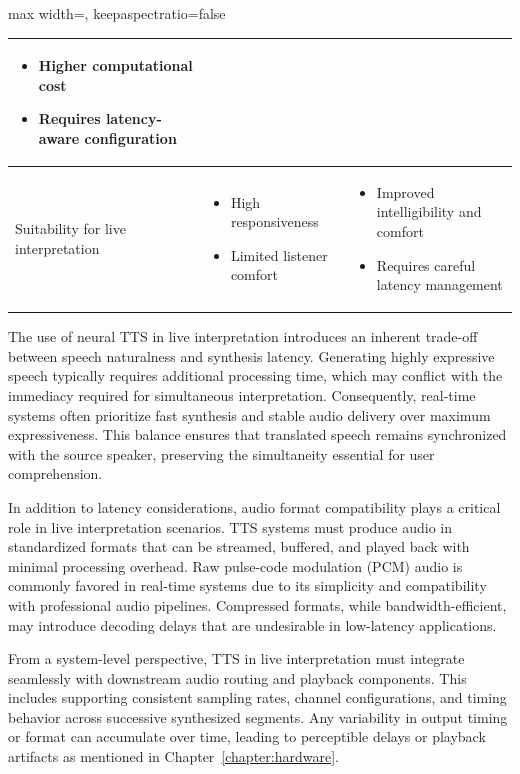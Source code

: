 \begin{table}[!htbp]
\begin{adjustbox}{max width=\textwidth, keepaspectratio=false}
\begin{tabular}{p{4.3cm} p{7.5cm} p{7.5cm}}
\begin{itemize}[nosep,leftmargin=*]
        \item Higher computational cost
        \item Requires latency-aware configuration
      \end{itemize} \\
      \midrule
      Suitability for live interpretation
      &
      \begin{itemize}[nosep,leftmargin=*]
        \item High responsiveness
        \item Limited listener comfort
      \end{itemize}
      &
      \begin{itemize}[nosep,leftmargin=*]
        \item Improved intelligibility and comfort
        \item Requires careful latency management
      \end{itemize} \\
      \bottomrule
    \end{tabular}
  \end{adjustbox}
\end{table}


The use of neural TTS in live interpretation introduces an inherent trade-off between speech naturalness and synthesis latency. Generating highly expressive speech typically requires additional processing time, which may conflict with the immediacy required for simultaneous interpretation. Consequently, real-time systems often prioritize fast synthesis and stable audio delivery over maximum expressiveness. This balance ensures that translated speech remains synchronized with the source speaker, preserving the simultaneity essential for user comprehension.

In addition to latency considerations, audio format compatibility plays a critical role in live interpretation scenarios. TTS systems must produce audio in standardized formats that can be streamed, buffered, and played back with minimal processing overhead. Raw pulse-code modulation (PCM) audio is commonly favored in real-time systems due to its simplicity and compatibility with professional audio pipelines. Compressed formats, while bandwidth-efficient, may introduce decoding delays that are undesirable in low-latency applications.

From a system-level perspective, TTS in live interpretation must integrate seamlessly with downstream audio routing and playback components. This includes supporting consistent sampling rates, channel configurations, and timing behavior across successive synthesized segments. Any variability in output timing or format can accumulate over time, leading to perceptible delays or playback artifacts as mentioned in Chapter~\ref{chapter:hardware}.



